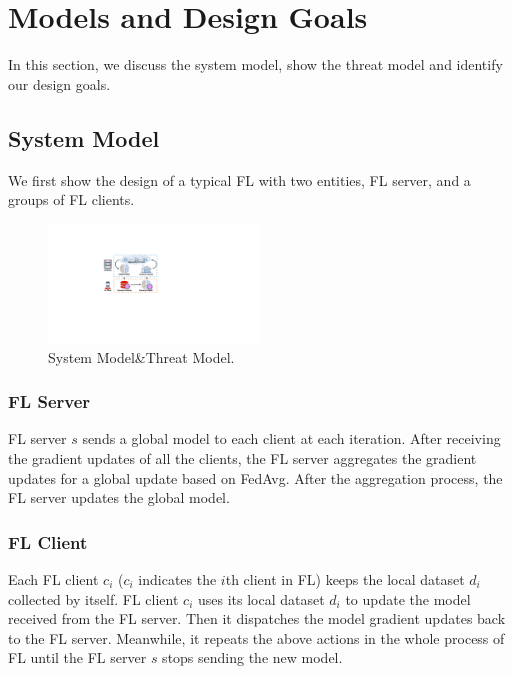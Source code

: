 \documentclass[journal]{IEEEtran}
\begin{document}
\section{Models and Design Goals}

In this section, we discuss the system model, show the threat model and identify our design goals.

\subsection{System Model}We first show the design of a typical FL with two entities, FL server, and a groups of FL clients.
  \begin{figure}
    \centering
  \includegraphics[width=0.5\textwidth]{figures/Figure_System.pdf}
  \caption{System Model\&Threat Model.}
  \label{fig_system}
  \end{figure}   
\subsubsection{{FL Server}} FL server $s$ sends a global model to each client at each iteration. After receiving the gradient updates of all the clients, the FL server aggregates the gradient updates for a global update based on FedAvg. After the aggregation process, the FL server updates the global model.

\subsubsection{{FL Client}} Each FL client {$c_{i}$} ($c_{i}$ indicates the $i$th client in FL) keeps the local dataset $d_{i}$ collected by itself. FL client $c_{i}$ uses its local dataset $d_{i}$ to update the model received from the FL server. Then it dispatches the model gradient updates back to the FL server. Meanwhile, it repeats the above actions in the whole process of FL until the FL server $s$ stops sending the new model.
\end{document}
